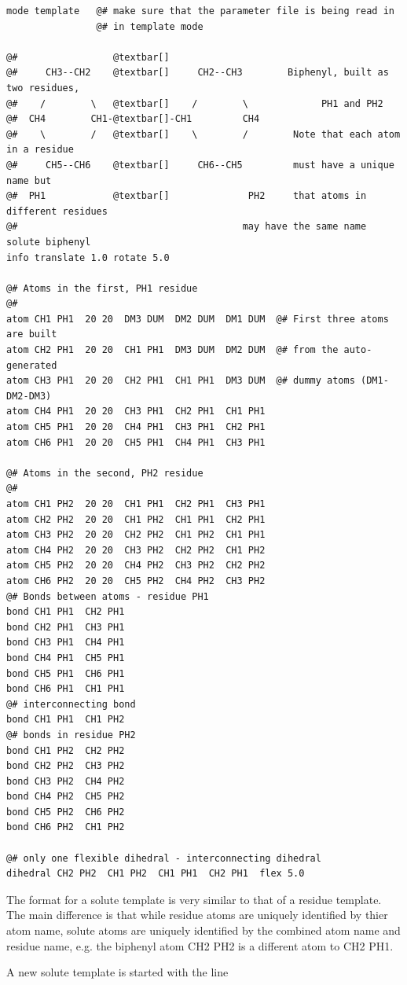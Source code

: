 \documentclass[letterpaper,10pt,english]{manual}
\begin{document}
\begin{Verbatim}[commandchars=@\[\]]
mode template   @# make sure that the parameter file is being read in
                @# in template mode

@#                 @textbar[]
@#     CH3--CH2    @textbar[]     CH2--CH3        Biphenyl, built as two residues,
@#    /        \   @textbar[]    /        \             PH1 and PH2
@#  CH4        CH1-@textbar[]-CH1         CH4
@#    \        /   @textbar[]    \        /        Note that each atom in a residue
@#     CH5--CH6    @textbar[]     CH6--CH5         must have a unique name but
@#  PH1            @textbar[]              PH2     that atoms in different residues
@#                                        may have the same name
solute biphenyl
info translate 1.0 rotate 5.0

@# Atoms in the first, PH1 residue
@#
atom CH1 PH1  20 20  DM3 DUM  DM2 DUM  DM1 DUM  @# First three atoms are built
atom CH2 PH1  20 20  CH1 PH1  DM3 DUM  DM2 DUM  @# from the auto-generated
atom CH3 PH1  20 20  CH2 PH1  CH1 PH1  DM3 DUM  @# dummy atoms (DM1-DM2-DM3)
atom CH4 PH1  20 20  CH3 PH1  CH2 PH1  CH1 PH1
atom CH5 PH1  20 20  CH4 PH1  CH3 PH1  CH2 PH1
atom CH6 PH1  20 20  CH5 PH1  CH4 PH1  CH3 PH1

@# Atoms in the second, PH2 residue
@#
atom CH1 PH2  20 20  CH1 PH1  CH2 PH1  CH3 PH1
atom CH2 PH2  20 20  CH1 PH2  CH1 PH1  CH2 PH1
atom CH3 PH2  20 20  CH2 PH2  CH1 PH2  CH1 PH1
atom CH4 PH2  20 20  CH3 PH2  CH2 PH2  CH1 PH2
atom CH5 PH2  20 20  CH4 PH2  CH3 PH2  CH2 PH2
atom CH6 PH2  20 20  CH5 PH2  CH4 PH2  CH3 PH2
@# Bonds between atoms - residue PH1
bond CH1 PH1  CH2 PH1
bond CH2 PH1  CH3 PH1
bond CH3 PH1  CH4 PH1
bond CH4 PH1  CH5 PH1
bond CH5 PH1  CH6 PH1
bond CH6 PH1  CH1 PH1
@# interconnecting bond
bond CH1 PH1  CH1 PH2
@# bonds in residue PH2
bond CH1 PH2  CH2 PH2
bond CH2 PH2  CH3 PH2
bond CH3 PH2  CH4 PH2
bond CH4 PH2  CH5 PH2
bond CH5 PH2  CH6 PH2
bond CH6 PH2  CH1 PH2

@# only one flexible dihedral - interconnecting dihedral
dihedral CH2 PH2  CH1 PH2  CH1 PH1  CH2 PH1  flex 5.0
\end{Verbatim}

The format for a solute template is very similar to that of a residue template. The main difference is that while residue atoms are uniquely identified by thier atom name, solute atoms are uniquely identified by the combined atom name and residue name, e.g. the biphenyl atom CH2 PH2 is a different atom to CH2 PH1.

A new solute template is started with the line
\end{document}
